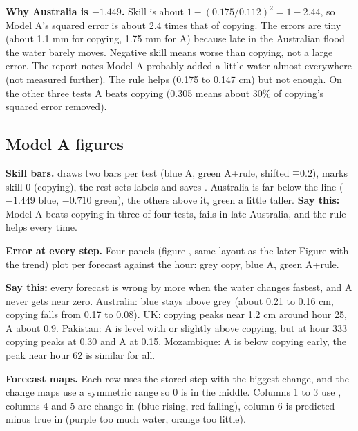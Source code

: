 \textbf{Why Australia is $-1.449$.} Skill is about $1-(0.175/0.112)^2 = 1-2.44$, so Model A's squared error is about 2.4 times that of copying. The errors are tiny (about 1.1 mm for copying, 1.75 mm for A) because late in the Australian flood the water barely moves. Negative skill means worse than copying, not a large error. The report notes Model A probably added a little water almost everywhere (not measured further). The rule helps (0.175 to 0.147 cm) but not enough. On the other three tests A beats copying (0.305 means about 30\% of copying's squared error removed).


\subsection{Model A figures}

\textbf{Skill bars.}  draws two bars per test (blue A, green A+rule, shifted $\mp0.2$),  marks skill 0 (copying), the rest sets labels and saves . Australia is far below the line ($-1.449$ blue, $-0.710$ green), the others above it, green a little taller. \textbf{Say this:} Model A beats copying in three of four tests, fails in late Australia, and the rule helps every time.

\textbf{Error at every step.} Four panels (figure , same layout as the later Figure with the trend) plot  per forecast against the hour: grey copy, blue A, green A+rule.

\textbf{Say this:} every forecast is wrong by more when the water changes fastest, and A never gets near zero. Australia: blue stays above grey (about 0.21 to 0.16 cm, copying falls from 0.17 to 0.08). UK: copying peaks near 1.2 cm around hour 25, A about 0.9. Pakistan: A is level with or slightly above copying, but at hour 333 copying peaks at 0.30 and A at 0.15. Mozambique: A is below copying early, the peak near hour 62 is similar for all.

\textbf{Forecast maps.} Each row uses the stored step with the biggest change, and the change maps use a symmetric range so 0 is in the middle. Columns 1 to 3 use , columns 4 and 5 are change in  (blue rising, red falling), column 6 is predicted minus true in  (purple too much water, orange too little). 

